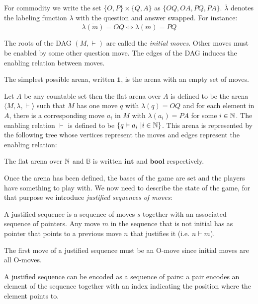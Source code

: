 For commodity we write the set $\{O,P\} \times \{Q,A\}$ as $\{OQ,OA,PQ,PA\}$.
$\overline{\lambda}$ denotes the labeling function $\lambda$ with the question and answer swapped. For instance:
$$\overline{\lambda(m)} = OQ \iff \lambda(m) = PQ$$

The roots of the DAG $(M,\vdash)$ are called the \emph{initial moves}.
Other moves must be enabled by some other question move. The edges of the DAG induces the enabling relation between moves.

The simplest possible arena, written $\mathbf{1}$, is the arena with an empty set of moves.

\begin{exmp}
\label{exmp:flatarena}

 Let $A$ be any countable set then the flat arena over $A$
is defined to be the arena $\langle M, \lambda, \vdash \rangle$ such
that $M$ has one move $q$ with $\lambda(q) = OQ$ and for each
element in $A$, there is a corresponding move $a_i$ in $M$ with
$\lambda(a_i) = PA$ for some $i \in \mathbb{N}$. The enabling relation
$\vdash$ is defined to be $\{ q \vdash a_i \ | i \in \mathbb{N} \}$.
This arena is represented by the following tree whose vertices represent the moves and edges represent the enabling relation:
\begin{center}
    {      \TR{\ldots} }
\end{center}
The flat arena over $\mathbb{N}$ and $\mathbb{B}$ is written
$\mathbf{int}$ and  $\mathbf{bool}$ respectively.
\end{exmp}

Once the arena has been defined, the bases of the game are set and the players have something to play with.
We now need to describe the state of the game, for that purpose
we introduce \emph{justified sequences of moves}:
\begin{dfn}
A justified sequence is a sequence of moves $s$ together with an associated sequence of pointers. Any
move $m$ in the sequence that is not initial has as pointer that points to a previous move $n$ that justifies it (i.e. $n \vdash m$).
\end{dfn}
The first move of a justified sequence must be an O-move since
initial moves are all O-moves.

A justified sequence can be encoded as a sequence of pairs: a pair encodes an element of the sequence together
with an index indicating the position where the element points to.

